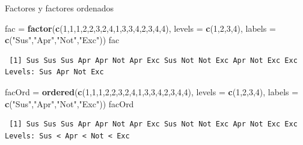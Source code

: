 \documentclass[
  ignorenonframetext,
]{beamer}
\newenvironment{Shaded}{\begin{snugshade}}{\end{snugshade}}
\newcommand{\AttributeTok}[1]{\textcolor[rgb]{0.13,0.29,0.53}{#1}}
\newcommand{\DecValTok}[1]{\textcolor[rgb]{0.00,0.00,0.81}{#1}}
\newcommand{\FunctionTok}[1]{\textcolor[rgb]{0.13,0.29,0.53}{\textbf{#1}}}
\newcommand{\NormalTok}[1]{#1}
\newcommand{\OtherTok}[1]{\textcolor[rgb]{0.56,0.35,0.01}{#1}}
\newcommand{\StringTok}[1]{\textcolor[rgb]{0.31,0.60,0.02}{#1}}
\begin{document}
\begin{frame}[fragile]{Factores y factores ordenados}
\label{factores-y-factores-ordenados}
\begin{Shaded}
\begin{Highlighting}[]
\NormalTok{fac }\OtherTok{=} \FunctionTok{factor}\NormalTok{(}\FunctionTok{c}\NormalTok{(}\DecValTok{1}\NormalTok{,}\DecValTok{1}\NormalTok{,}\DecValTok{1}\NormalTok{,}\DecValTok{2}\NormalTok{,}\DecValTok{2}\NormalTok{,}\DecValTok{3}\NormalTok{,}\DecValTok{2}\NormalTok{,}\DecValTok{4}\NormalTok{,}\DecValTok{1}\NormalTok{,}\DecValTok{3}\NormalTok{,}\DecValTok{3}\NormalTok{,}\DecValTok{4}\NormalTok{,}\DecValTok{2}\NormalTok{,}\DecValTok{3}\NormalTok{,}\DecValTok{4}\NormalTok{,}\DecValTok{4}\NormalTok{), }
       \AttributeTok{levels =} \FunctionTok{c}\NormalTok{(}\DecValTok{1}\NormalTok{,}\DecValTok{2}\NormalTok{,}\DecValTok{3}\NormalTok{,}\DecValTok{4}\NormalTok{), }\AttributeTok{labels =} \FunctionTok{c}\NormalTok{(}\StringTok{"Sus"}\NormalTok{,}\StringTok{"Apr"}\NormalTok{,}\StringTok{"Not"}\NormalTok{,}\StringTok{"Exc"}\NormalTok{))}
\NormalTok{fac}
\end{Highlighting}
\end{Shaded}

\begin{verbatim}
 [1] Sus Sus Sus Apr Apr Not Apr Exc Sus Not Not Exc Apr Not Exc Exc
Levels: Sus Apr Not Exc
\end{verbatim}

\begin{Shaded}
\begin{Highlighting}[]
\NormalTok{facOrd }\OtherTok{=} \FunctionTok{ordered}\NormalTok{(}\FunctionTok{c}\NormalTok{(}\DecValTok{1}\NormalTok{,}\DecValTok{1}\NormalTok{,}\DecValTok{1}\NormalTok{,}\DecValTok{2}\NormalTok{,}\DecValTok{2}\NormalTok{,}\DecValTok{3}\NormalTok{,}\DecValTok{2}\NormalTok{,}\DecValTok{4}\NormalTok{,}\DecValTok{1}\NormalTok{,}\DecValTok{3}\NormalTok{,}\DecValTok{3}\NormalTok{,}\DecValTok{4}\NormalTok{,}\DecValTok{2}\NormalTok{,}\DecValTok{3}\NormalTok{,}\DecValTok{4}\NormalTok{,}\DecValTok{4}\NormalTok{), }
       \AttributeTok{levels =} \FunctionTok{c}\NormalTok{(}\DecValTok{1}\NormalTok{,}\DecValTok{2}\NormalTok{,}\DecValTok{3}\NormalTok{,}\DecValTok{4}\NormalTok{), }\AttributeTok{labels =} \FunctionTok{c}\NormalTok{(}\StringTok{"Sus"}\NormalTok{,}\StringTok{"Apr"}\NormalTok{,}\StringTok{"Not"}\NormalTok{,}\StringTok{"Exc"}\NormalTok{))}
\NormalTok{facOrd}
\end{Highlighting}
\end{Shaded}

\begin{verbatim}
 [1] Sus Sus Sus Apr Apr Not Apr Exc Sus Not Not Exc Apr Not Exc Exc
Levels: Sus < Apr < Not < Exc
\end{verbatim}
\end{frame}
\end{document}
